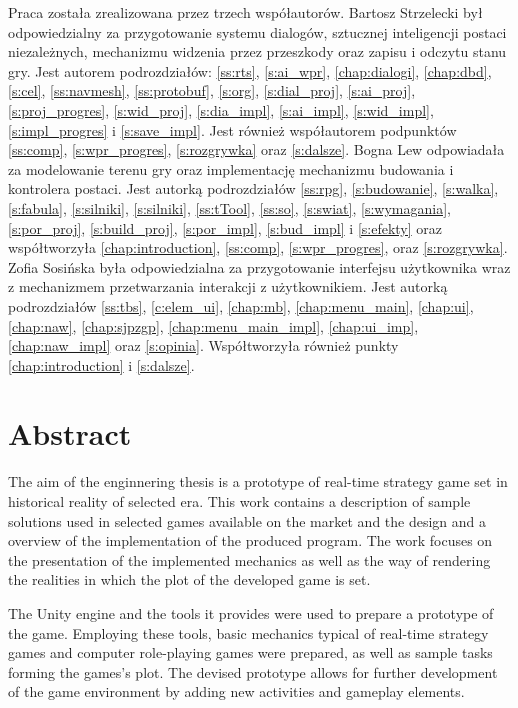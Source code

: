 Praca została zrealizowana przez trzech współautorów. Bartosz Strzelecki był odpowiedzialny za przygotowanie systemu
dialogów, sztucznej inteligencji postaci niezależnych, mechanizmu widzenia przez przeszkody oraz zapisu i odczytu stanu gry.
Jest autorem podrozdziałów: \ref{ss:rts},
\ref{s:ai_wpr}, \ref{chap:dialogi}, \ref{chap:dbd}, \ref{s:cel}, \ref{ss:navmesh}, \ref{ss:protobuf}, \ref{s:org},
\ref{s:dial_proj}, \ref{s:ai_proj}, \ref{s:proj_progres}, \ref{s:wid_proj}, \ref{s:dia_impl}, \ref{s:ai_impl}, \ref{s:wid_impl}, \ref{s:impl_progres} i
\ref{s:save_impl}. Jest również współautorem podpunktów \ref{ss:comp}, \ref{s:wpr_progres}, \ref{s:rozgrywka} oraz \ref{s:dalsze}.
Bogna Lew odpowiadała za modelowanie terenu gry oraz implementację mechanizmu budowania i kontrolera postaci. Jest autorką
podrozdziałów \ref{ss:rpg}, \ref{s:budowanie}, \ref{s:walka}, \ref{s:fabula}, \ref{s:silniki}, \ref{s:silniki},
\ref{ss:tTool}, \ref{ss:so}, \ref{s:swiat}, \ref{s:wymagania}, \ref{s:por_proj}, \ref{s:build_proj}, \ref{s:por_impl}, \ref{s:bud_impl} i
\ref{s:efekty} oraz współtworzyła \ref{chap:introduction}, \ref{ss:comp}, \ref{s:wpr_progres}, oraz \ref{s:rozgrywka}.
Zofia Sosińska była odpowiedzialna za przygotowanie interfejsu użytkownika wraz z mechanizmem przetwarzania interakcji z użytkownikiem. Jest
autorką podrozdziałów \ref{ss:tbs}, \ref{c:elem_ui}, \ref{chap:mb},
\ref{chap:menu_main}, \ref{chap:ui}, \ref{chap:naw}, \ref{chap:sjpzgp}, \ref{chap:menu_main_impl}, \ref{chap:ui_imp},
\ref{chap:naw_impl} oraz \ref{s:opinia}. Współtworzyła również punkty \ref{chap:introduction} i \ref{s:dalsze}.

\chapter*{Abstract}
The aim of the enginnering thesis is a prototype of real-time strategy game set in historical reality of selected era.
This work contains a description of sample solutions used in selected games available on the market
and the design and a overview of the implementation of the produced program. The work focuses on the presentation 
of the implemented mechanics as well as
the way of rendering the realities in which the plot of the developed game is set.

The Unity engine and the tools it provides were used to prepare a prototype of the game.
Employing these tools, basic mechanics typical of real-time strategy games and computer role-playing games were prepared,
as well as sample tasks forming the games's plot. The devised prototype allows for 
further development of the game environment by adding new activities and gameplay elements.

